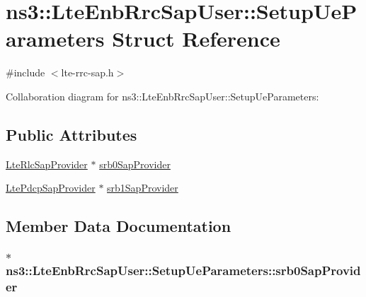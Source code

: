 \hypertarget{structns3_1_1LteEnbRrcSapUser_1_1SetupUeParameters}{}\section{ns3\+:\+:Lte\+Enb\+Rrc\+Sap\+User\+:\+:Setup\+Ue\+Parameters Struct Reference}
\label{structns3_1_1LteEnbRrcSapUser_1_1SetupUeParameters}


{\ttfamily \#include $<$lte-\/rrc-\/sap.\+h$>$}



Collaboration diagram for ns3\+:\+:Lte\+Enb\+Rrc\+Sap\+User\+:\+:Setup\+Ue\+Parameters\+:
\subsection*{Public Attributes}
\begin{DoxyCompactItemize}
\item 
\hyperlink{classns3_1_1LteRlcSapProvider}{Lte\+Rlc\+Sap\+Provider} $\ast$ \hyperlink{structns3_1_1LteEnbRrcSapUser_1_1SetupUeParameters_a563df2ddef70cddcaad5af2db0ff29d7}{srb0\+Sap\+Provider}
\item 
\hyperlink{classns3_1_1LtePdcpSapProvider}{Lte\+Pdcp\+Sap\+Provider} $\ast$ \hyperlink{structns3_1_1LteEnbRrcSapUser_1_1SetupUeParameters_a1b742da9535b4e30eb58c62f32e3ab50}{srb1\+Sap\+Provider}
\end{DoxyCompactItemize}


\subsection{Member Data Documentation}
\subsubsection[{\texorpdfstring{srb0\+Sap\+Provider}{srb0SapProvider}}]{$\ast$ ns3\+::\+Lte\+Enb\+Rrc\+Sap\+User\+::\+Setup\+Ue\+Parameters\+::srb0\+Sap\+Provider}\hypertarget{structns3_1_1LteEnbRrcSapUser_1_1SetupUeParameters_a563df2ddef70cddcaad5af2db0ff29d7}{}\label{structns3_1_1LteEnbRrcSapUser_1_1SetupUeParameters_a563df2ddef70cddcaad5af2db0ff29d7}
